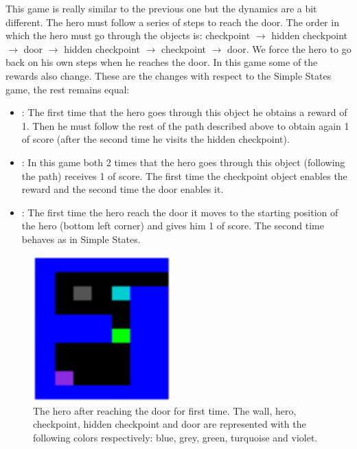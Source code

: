 This game is really similar to the previous one but the dynamics are a bit different.
The hero must follow a series of steps to reach the door.
The order in which the hero must go through the objects is: checkpoint $\rightarrow$ hidden checkpoint $\rightarrow$
door $\rightarrow$ hidden checkpoint $\rightarrow$ checkpoint $\rightarrow$ door.
We force the hero to go back on his own steps when he reaches the door.
In this game some of the rewards also change.
These are the changes with respect to the Simple States game, the rest remains equal:
\begin{itemize}
    \item {}: The first time that the hero goes through this object he obtains a reward of 1.
    Then he must follow the rest of the path described above to obtain again 1 of score (after the second time he visits the hidden checkpoint).
    \item {}: In this game both 2 times that the hero goes through this object
    (following the path) receives 1 of score.
    The first time the checkpoint object enables the reward and the second time the door enables it.
    \item {}: The first time the hero reach the door it moves to the starting position of the hero (bottom left corner)
    and gives him 1 of score.
    The second time behaves as in Simple States.
\end{itemize}

\begin{figure}[hbtp]
\begin{center}
\includegraphics[width=200]{img/ComplexStates_going_back.png}
\end{center}
\caption[Complex States game]
{The hero after reaching the door for first time. The wall, hero, checkpoint, hidden checkpoint
and door are represented with the following colors respectively: blue, grey, green, turquoise and violet.}
\label{fig:ComplexStates}
\end{figure}


